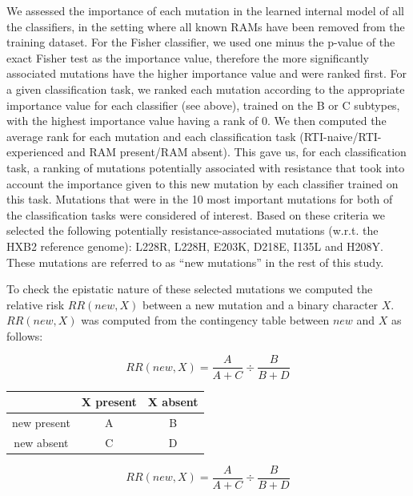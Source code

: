 \documentclass[
  11pt,
  twoside,
  BCOR=10mm,
  listof=totoc]{scrbook}
\begin{document}
We assessed the importance of each mutation in the learned internal
model of all the classifiers, in the setting where all known RAMs have
been removed from the training dataset. For the Fisher classifier, we
used one minus the p-value of the exact Fisher test as the importance
value, therefore the more significantly associated mutations have the
higher importance value and were ranked first. For a given
classification task, we ranked each mutation according to the
appropriate importance value for each classifier (see above), trained on
the B or C subtypes, with the highest importance value having a rank of 0. We then computed the average rank for each mutation and each
classification task (RTI-naive/RTI-experienced and RAM present/RAM
absent). This gave us, for each classification task, a ranking of
mutations potentially associated with resistance that took into account
the importance given to this new mutation by each classifier trained on
this task. Mutations that were in the 10 most important mutations for
both of the classification tasks were considered of interest. Based on
these criteria we selected the following potentially
resistance-associated mutations (w.r.t. the HXB2 reference genome):
L228R, L228H, E203K, D218E, I135L and H208Y. These mutations are
referred to as ``new mutations'' in the rest of this study.

To check the epistatic nature of these selected mutations we computed
the relative risk \(RR(new, X)\) between a new mutation and a binary
character \(X\). \(RR(new,X)\) was computed from the contingency table
between \(new\) and \(X\) as follows:

\begin{htmlonly}
\[
RR(new,X) = \frac{A}{A+C} \div \frac{B}{B+D}
\]

\end{htmlonly}

\begin{minipage}{0.45\textwidth}
    \bigskip
    \begin{tabular}{ccc}
                    & X present & X absent\\ \midrule
        new present & A         & B       \\
        new absent  & C         & D       \\ \bottomrule
    \end{tabular}
\end{minipage}
\begin{minipage}{0.45\textwidth}
    \begin{equation*}
        RR(new,X) = \frac{A}{A+C} \div \frac{B}{B+D}
    \end{equation*}
\end{minipage}
\bigskip
\end{document}
